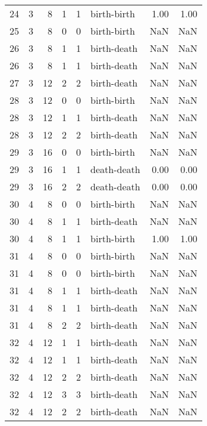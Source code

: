 \documentclass{article}
\begin{document}
\begin{center}
\begin{tabular}{rrrrrlrr}
24 & 3 & 8 & 1 & 1 & birth-birth & 1.00 & 1.00 \\
25 & 3 & 8 & 0 & 0 & birth-birth & NaN & NaN \\
26 & 3 & 8 & 1 & 1 & birth-death & NaN & NaN \\
26 & 3 & 8 & 1 & 1 & birth-death & NaN & NaN \\
27 & 3 & 12 & 2 & 2 & birth-death & NaN & NaN \\
28 & 3 & 12 & 0 & 0 & birth-birth & NaN & NaN \\
28 & 3 & 12 & 1 & 1 & birth-death & NaN & NaN \\
28 & 3 & 12 & 2 & 2 & birth-death & NaN & NaN \\
29 & 3 & 16 & 0 & 0 & birth-birth & NaN & NaN \\
29 & 3 & 16 & 1 & 1 & death-death & 0.00 & 0.00 \\
29 & 3 & 16 & 2 & 2 & death-death & 0.00 & 0.00 \\
30 & 4 & 8 & 0 & 0 & birth-birth & NaN & NaN \\
30 & 4 & 8 & 1 & 1 & birth-death & NaN & NaN \\
30 & 4 & 8 & 1 & 1 & birth-birth & 1.00 & 1.00 \\
31 & 4 & 8 & 0 & 0 & birth-birth & NaN & NaN \\
31 & 4 & 8 & 0 & 0 & birth-birth & NaN & NaN \\
31 & 4 & 8 & 1 & 1 & birth-death & NaN & NaN \\
31 & 4 & 8 & 1 & 1 & birth-death & NaN & NaN \\
31 & 4 & 8 & 2 & 2 & birth-death & NaN & NaN \\
32 & 4 & 12 & 1 & 1 & birth-death & NaN & NaN \\
32 & 4 & 12 & 1 & 1 & birth-death & NaN & NaN \\
32 & 4 & 12 & 2 & 2 & birth-death & NaN & NaN \\
32 & 4 & 12 & 3 & 3 & birth-death & NaN & NaN \\
32 & 4 & 12 & 2 & 2 & birth-death & NaN & NaN \\
\bottomrule
\end{tabular}
\end{center}
\end{document}
